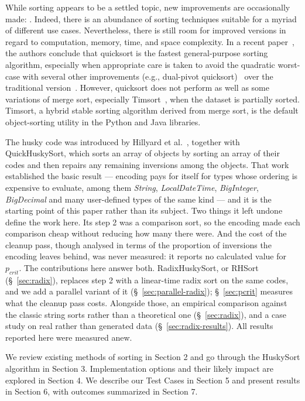 \documentclass[twoside,leqno,twocolumn]{article}
\begin{document}
While sorting appears to be a settled topic, new improvements are occasionally made:
\cite{Dual-pivot,Timsort,doi:10.1137/1.9781611975994.101,10.5555/313559.313859,10.1002/spe.4380231105}.
Indeed, there is an abundance of sorting techniques suitable for a myriad of different use cases.
Nevertheless, there is still room for improved versions in regard to computation, memory, time, and space complexity.
In a recent paper~\cite{sort}, the authors conclude that quicksort is the fastest general-purpose sorting algorithm,
especially when appropriate care is taken to avoid the quadratic worst-case with several other improvements
(e.g., dual-pivot quicksort)~\cite{Dual-pivot} over the traditional version~\cite{10.1145/366622.366644}.
However, quicksort does not perform as well as some variations of merge sort, especially Timsort~\cite{Timsort}, when the dataset is partially sorted.
Timsort, a hybrid stable sorting algorithm derived from merge sort, is the default object-sorting utility in the Python and Java libraries.

The husky code was introduced by Hillyard et al.~\cite{huskysort2020}, together with QuickHuskySort,
which sorts an array of objects by sorting an array of their codes and then repairs any remaining inversions among the objects.
That work established the basic result --- encoding pays for itself for types whose ordering is expensive
to evaluate, among them \emph{String}, \emph{LocalDateTime}, \emph{BigInteger}, \emph{BigDecimal} and many
user-defined types of the same kind --- and it is the starting point of this paper rather than its
subject.
Two things it left undone define the work here.
Its step 2 was a comparison sort, so the encoding made each comparison cheap without reducing how
many there were.
And the cost of the cleanup pass, though analysed in terms of the proportion of inversions the
encoding leaves behind, was never measured: it reports no calculated value for $p_{crit}$.
The contributions here answer both.
RadixHuskySort, or RHSort (\S~\ref{sec:radix}), replaces step 2 with a linear-time radix sort on the
same codes, and we add a parallel variant of it (\S~\ref{sec:parallel-radix});
\S~\ref{sec:pcrit} measures what the cleanup pass costs.
Alongside those, an empirical comparison against the classic string sorts rather than a theoretical
one (\S~\ref{sec:radix}), and a case study on real rather than generated data
(\S~\ref{sec:radix-results}).
All results reported here were measured anew.

We review existing methods of sorting in Section 2 and go through the HuskySort algorithm in Section 3.
Implementation options and their likely impact are explored in Section 4.
We describe our Test Cases in Section 5 and present results in Section 6, with outcomes summarized in Section 7.
\end{document}
